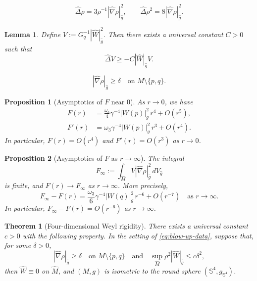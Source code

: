 \documentclass[10pt,a4paper]{amsart}
\newtheorem{theorem}{Theorem}
\newtheorem{lemma}{Lemma}
\newtheorem{proposition}{Proposition}
\renewcommand{\S}{\mathbb{S}}
\newcommand{\dv}{\,dV_{\widehat{g}}}
\newcommand{\hd}{\widehat{\Delta}}
\newcommand{\hg}{\widehat{g}}
\newcommand{\hm}{\widehat{M}}
\newcommand{\hn}{\widehat{\nabla}}
\newcommand{\hw}{\widehat{W}}
\begin{document}
\begin{equation}\label{eq:lem2.1}
\hd\rho=3\rho^{-1}|\hn\rho|^2_{\hg},\qquad \hd\rho^2=8|\hn\rho|_{\hg}^2.
\end{equation}

\begin{lemma}\label{lem:Kato}
Define $ V:=G_q^{-1}|\hw|^2_{\hg}$. Then there exists a universal constant $C>0$ such that
\begin{equation}\label{eq:lem2.2}
\hd V\ge-C|\hw|_{\hg}V.
\end{equation} 
\end{lemma}

\begin{equation}\label{eq:assumption sec1}
|\hn\rho|_{\hg}\ge\delta\quad\text{on $M\setminus\{p,q\}$.}
\end{equation}

\begin{proposition}[Asymptotics of $F$ near $0$]\label{prop:asymptotic of F near 0}
As $r\rightarrow0$, we have
\begin{align}
    \label{eq:asymptotic of F near 0}F(r)&=\frac{\omega_3}{4}\gamma^{-4}|W(p)|^2_g\,r^4+O(r^5),\\
    \label{eq:asymptotic of F' near 0}F'(r)&=\omega_3\gamma^{-4}|W(p)|_g^2\,r^3+O(r^4).
\end{align}
In particular, $F(r)=O(r^4)$ and $F'(r)=O(r^3)$ as $r\rightarrow0$.
\end{proposition}

\begin{proposition}[Asymptotics of $F$ as $r\rightarrow\infty$]\label{prop:asymptotic of F at infinity}
The integral
\begin{equation*}
F_\infty:=\int_{\hm}V|\hn\rho|_{\hg}^2\dv
\end{equation*}
is finite, and $F(r)\rightarrow F_\infty$ as $r\rightarrow\infty$. More precisely,
\begin{equation}
\label{eq:asymptotic of F at infinity}
F_\infty-F(r)=\frac{\omega_3}{6}\gamma^{-4}|W(q)|_g^2\,r^{-6}+O(r^{-7})\quad\text{as } r\rightarrow\infty.
\end{equation}
In particular, $F_\infty-F(r)=O(r^{-6})$ as $r\rightarrow\infty$. 
\end{proposition}

\begin{theorem}[Four-dimensional Weyl rigidity]\label{thm1}
There exists a universal constant $c>0$ with the following property. In the setting of \eqref{eq:blow-up-data}, suppose that, for some $\delta>0$, 
\begin{equation*}
|\hn\rho|_{\hg}\ge\delta\quad\text{on $M\setminus\{p,q\}$}\quad \text{and}\quad \sup_{\hm}\rho^2|\hw|_{\hg}\le c\delta^2,
\end{equation*}
then $\hw\equiv 0$ on $\hm$, and $(M,g)$ is isometric to the round sphere $(\S^4,g_{\S^4})$.
\end{theorem}
\end{document}
